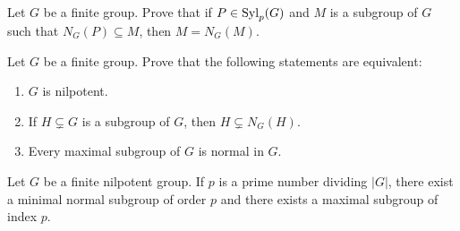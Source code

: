 \begin{exercise}
\label{xca:truco}
Let $G$ be a finite group. Prove that if $P\in\mathrm{Syl}_p(G)$ and $M$ is a subgroup of $G$ such that 
$N_G(P)\subseteq M$, then $M=N_G(M)$. 
\end{exercise}


\begin{exercise}
\label{xca:normalizadora}
Let $G$ be a finite group. Prove that the following statements are equivalent:
\begin{enumerate}
	\item $G$ is nilpotent.
	\item If $H\subsetneq G$ is a subgroup of $G$, then $H\subsetneq N_G(H)$.
	\item Every maximal subgroup of $G$ is normal in $G$.
\end{enumerate}
\end{exercise}



\begin{theorem}
Let $G$ be a finite nilpotent group. If $p$ is a prime number dividing 
$|G|$, there exist a minimal normal subgroup of order $p$ and 
there exists a maximal subgroup of index $p$. 
\end{theorem}

